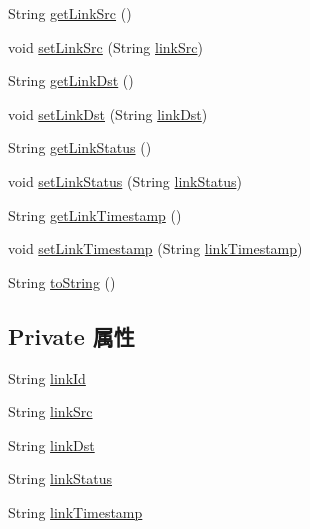 \begin{DoxyCompactItemize}
\item 
String \mbox{\hyperlink{classcom_1_1example_1_1demo_1_1modular_1_1_link_acd34aed24b24ed56e5d416aae4ed2faa}{get\+Link\+Src}} ()
\item 
void \mbox{\hyperlink{classcom_1_1example_1_1demo_1_1modular_1_1_link_a81f32e20b0d8a57e0e5bdc0b4e7c40c3}{set\+Link\+Src}} (String \mbox{\hyperlink{classcom_1_1example_1_1demo_1_1modular_1_1_link_ac2d049679fb46a361629257f5733c3df}{link\+Src}})
\item 
String \mbox{\hyperlink{classcom_1_1example_1_1demo_1_1modular_1_1_link_a063a87d00196751e8a4566b6352f2b5d}{get\+Link\+Dst}} ()
\item 
void \mbox{\hyperlink{classcom_1_1example_1_1demo_1_1modular_1_1_link_a8ec7378d9ffab402b4b21554e1a47231}{set\+Link\+Dst}} (String \mbox{\hyperlink{classcom_1_1example_1_1demo_1_1modular_1_1_link_af8571037fa483b1ecb926929e6006283}{link\+Dst}})
\item 
String \mbox{\hyperlink{classcom_1_1example_1_1demo_1_1modular_1_1_link_afcf18a615139352b35b03ace8e33537a}{get\+Link\+Status}} ()
\item 
void \mbox{\hyperlink{classcom_1_1example_1_1demo_1_1modular_1_1_link_a6e4639a05d8786b579bc43a2c230c592}{set\+Link\+Status}} (String \mbox{\hyperlink{classcom_1_1example_1_1demo_1_1modular_1_1_link_aefc889cc6b21a35d27cc1bc7152ee653}{link\+Status}})
\item 
String \mbox{\hyperlink{classcom_1_1example_1_1demo_1_1modular_1_1_link_adb932482eacc858e41ea38778a2f0aae}{get\+Link\+Timestamp}} ()
\item 
void \mbox{\hyperlink{classcom_1_1example_1_1demo_1_1modular_1_1_link_a53e173d2ea554009732dca9149a291da}{set\+Link\+Timestamp}} (String \mbox{\hyperlink{classcom_1_1example_1_1demo_1_1modular_1_1_link_a6639c75dac171ec78ee5966dcd64a232}{link\+Timestamp}})
\item 
String \mbox{\hyperlink{classcom_1_1example_1_1demo_1_1modular_1_1_link_abb1376727bb35829126c04e5bd92af01}{to\+String}} ()
\end{DoxyCompactItemize}
\subsection*{Private 属性}
\begin{DoxyCompactItemize}
\item 
String \mbox{\hyperlink{classcom_1_1example_1_1demo_1_1modular_1_1_link_a7bb7ef4e4718a74b4bc8db673de38844}{link\+Id}}
\item 
String \mbox{\hyperlink{classcom_1_1example_1_1demo_1_1modular_1_1_link_ac2d049679fb46a361629257f5733c3df}{link\+Src}}
\item 
String \mbox{\hyperlink{classcom_1_1example_1_1demo_1_1modular_1_1_link_af8571037fa483b1ecb926929e6006283}{link\+Dst}}
\item 
String \mbox{\hyperlink{classcom_1_1example_1_1demo_1_1modular_1_1_link_aefc889cc6b21a35d27cc1bc7152ee653}{link\+Status}}
\item 
String \mbox{\hyperlink{classcom_1_1example_1_1demo_1_1modular_1_1_link_a6639c75dac171ec78ee5966dcd64a232}{link\+Timestamp}}
\end{DoxyCompactItemize}


